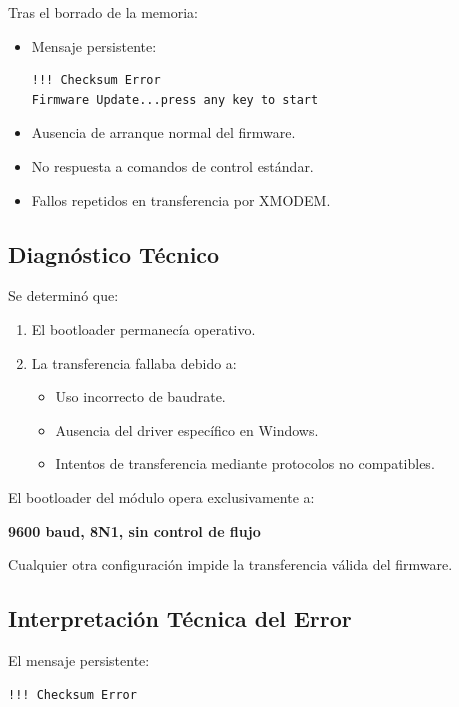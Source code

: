 \documentclass{article}
\begin{document}
Tras el borrado de la memoria:

\begin{itemize}
    \item Mensaje persistente:
\begin{verbatim}
!!! Checksum Error
Firmware Update...press any key to start
\end{verbatim}
    \item Ausencia de arranque normal del firmware.
    \item No respuesta a comandos de control estándar.
    \item Fallos repetidos en transferencia por XMODEM.
\end{itemize}



\subsection{Diagnóstico Técnico}

Se determinó que:

\begin{enumerate}
    \item El bootloader permanecía operativo.
    \item La transferencia fallaba debido a:
    \begin{itemize}
        \item Uso incorrecto de baudrate.
        \item Ausencia del driver específico en Windows.
        \item Intentos de transferencia mediante protocolos no compatibles.
    \end{itemize}
\end{enumerate}

El bootloader del módulo opera exclusivamente a:

\begin{center}
\textbf{9600 baud, 8N1, sin control de flujo}
\end{center}

Cualquier otra configuración impide la transferencia válida del firmware.

\subsection{Interpretación Técnica del Error}

El mensaje persistente:

\begin{verbatim}
!!! Checksum Error
\end{verbatim}
\end{document}
